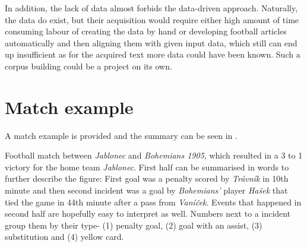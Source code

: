 In addition, the lack of data almost forbids the data-driven approach. Naturally, the data do exist, but their acquisition would require either high amount of time consuming labour of creating the data by hand or developing football articles automatically and then aligning them with given input data, which still can end up insufficient as for the acquired text more data could have been known. Such a corpus building could be a project on its own.

\section{Match example}
A match example is provided and the summary can be seen in . 

Football match between \emph{Jablonec} and \emph{Bohemians 1905}, which resulted in a 3 to 1 victory for the home team \emph{Jablonec}. First half can be summarised in words to further describe the figure: First goal was a penalty scored by \emph{Trávník} in 10th minute and then second incident was a goal by \emph{Bohemians'} player \emph{Hašek} that tied the game in 44th minute after a pass from \emph{Vaníček}. Events that happened in second half are hopefully easy to interpret as well. Numbers next to a incident group them by their type- (1) penalty goal, (2) goal with an assist, (3) substitution and (4) yellow card. 

